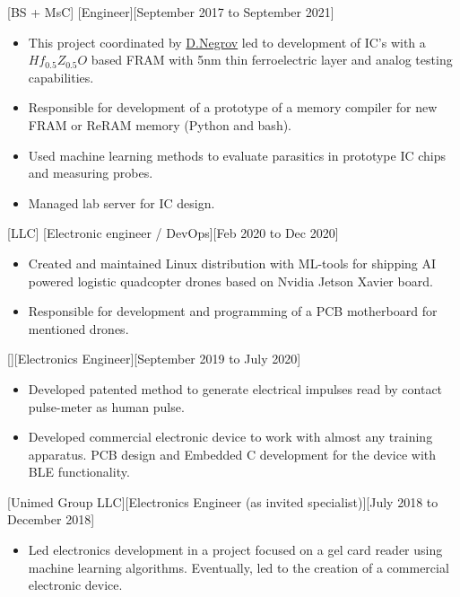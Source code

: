 \documentclass{article}
\begin{document}
[BS + MsC]
[Engineer][September 2017 to September 2021]
\begin{itemize}
\item This project coordinated by  \href{https://www.scopus.com/authid/detail.uri?authorId=56272708000}{D.Negrov} led to development of IC's with a $Hf_{0.5} Z_{0.5} O $ based  FRAM with 5nm thin ferroelectric layer and analog testing capabilities.
\item Responsible for development of a prototype of a memory  compiler for new FRAM or ReRAM memory (Python and bash).
\item Used machine learning methods to evaluate parasitics in prototype IC chips and measuring probes.
\item Managed lab server for IC design.
\end{itemize}

[LLC]
[Electronic engineer / DevOps][Feb 2020 to Dec 2020]
\begin{itemize}
\item Created and maintained Linux distribution with ML-tools for shipping AI powered logistic quadcopter drones based on Nvidia Jetson Xavier board.
\item Responsible for development and programming of a PCB motherboard for mentioned drones.
\end{itemize}
 
[][Electronics Engineer][September 2019 to July 2020]
\begin{itemize}
\item Developed patented method to generate electrical impulses read by contact pulse-meter as human pulse. 
\item Developed commercial electronic device to work with almost any training apparatus. PCB design and Embedded C development for the device with BLE functionality. 
\end{itemize}
 
[Unimed Group LLC][Electronics Engineer (as invited specialist)][July 2018 to December 2018]
 
\begin{itemize}
\item Led electronics development in a project focused on a gel card reader using machine learning algorithms. Eventually, led to the creation of a commercial electronic device.
\end{itemize}
 
\end{document}

